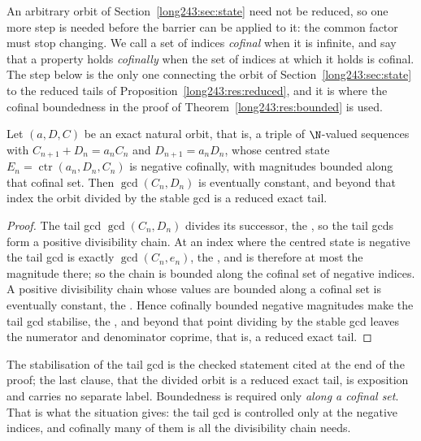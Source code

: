 \documentclass[11pt]{article}
\newcommand{\ctr}{\operatorname{ctr}}
\begin{document}
An arbitrary orbit of Section~\ref{long243:sec:state} need not be reduced, so one more step is needed
before the barrier can be applied to it: the common factor must stop changing.
We call a set of indices \emph{cofinal} when it is infinite, and say that a
property holds \emph{cofinally} when the set of indices at which it holds is
cofinal.  The step below is the only one connecting the orbit of
Section~\ref{long243:sec:state} to the reduced tails of
Proposition~\ref{long243:res:reduced}, and it is where the cofinal boundedness in the
proof of Theorem~\ref{long243:res:bounded} is used.

\begin{proposition}\label{long243:res:gcdstab}
Let $(a,D,C)$ be an exact natural orbit, that is, a triple of $\N$-valued
sequences with $C_{n+1}+D_n=a_nC_n$ and $D_{n+1}=a_nD_n$, whose centred state
$E_n=\ctr(a_n,D_n,C_n)$ is negative cofinally, with magnitudes bounded along
that cofinal set.  Then
$\gcd(C_n,D_n)$ is eventually constant, and beyond that index the orbit divided
by the stable gcd is a reduced exact tail.
\end{proposition}

\begin{proof}
The tail gcd $\gcd(C_n,D_n)$ divides its successor, the
, so the tail gcds form a positive divisibility chain.  At an
index where the centred state is negative the tail gcd is exactly
$\gcd(C_n,e_n)$, the
, and is therefore at most the magnitude there; so the
chain is bounded along the cofinal set of negative indices.  A positive
divisibility chain whose values are bounded along a cofinal set is eventually
constant, the
.  Hence cofinally bounded negative magnitudes make the tail gcd
stabilise, the
, and beyond that point dividing by the stable gcd leaves the
numerator and denominator coprime, that is, a reduced exact tail.
\end{proof}

\noindent The stabilisation of the tail gcd is the checked statement cited at
the end of the proof; the last clause, that the divided orbit is a reduced
exact tail, is exposition and carries no separate label.  Boundedness is
required only \emph{along a cofinal set}.  That is what the situation gives:
the tail gcd is
controlled only at the negative indices, and cofinally many of them is all the
divisibility chain needs.
\end{document}
